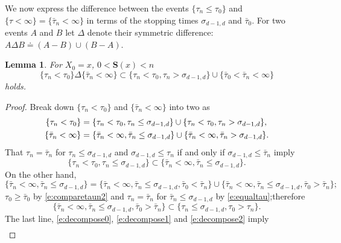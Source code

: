\documentclass[11pt,a4paper]{article}
\newtheorem{lemma}{Lemma}
\begin{document}
We now express the difference between the events
$\{\tau_n \le \tau_0\}$ and $\{\tau < \infty \} = \{\bar\tau_n < \infty \}$
in terms of the stopping times $\sigma_{d-1,d}$ and $\bar\tau_0.$
For two events $A$ and $B$ let $\Delta$ denote their symmetric difference:
$A \Delta B \doteq ( A - B) \cup (B - A).$
\begin{lemma}\label{l:boundondifference}
For $X_0 = x$,  $0 < {\bm S}(x) < n$
\begin{equation}\label{e:boundondifference}
\{\tau_n < \tau_0\}  \Delta \{ \bar\tau_n < \infty\}
\subset
\{ \tau_n < \tau_0,  \tau_n >\sigma_{d-1,d} \}
\cup \{ \bar\tau_0  < \bar\tau_n < \infty\}
\end{equation}
holds.
\end{lemma}
\begin{proof}
Break down $\{\tau_n < \tau_0\}$ and
$\{\bar\tau_n < \infty\}$ into two as
\begin{align}\label{e:decompose0}
\{ \tau_n < \tau_0 \} &= \{ \tau_n < \tau_0,  \tau_n \le \sigma_{d-1,d} \} \cup \{ \tau_n < \tau_0,  \tau_n > \sigma_{d-1,d} \},\\
\{ \bar\tau_n < \infty \} &= \{ \bar\tau_n < \infty,  \bar\tau_n \le \sigma_{d-1,d} \} \cup \{ \bar\tau_n < \infty,  \bar\tau_n > \sigma_{d-1,d} \}.
\notag
\end{align}
That $\tau_n = \bar\tau_n$ for  $\tau_n \le \sigma_{d-1,d}$ and
$\sigma_{d-1,d} \le \tau_n$ if and only if 
$\sigma_{d-1,d} \le \bar\tau_n$ imply
\begin{equation}\label{e:decompose1}
\{ \tau_n < \tau_0,  \tau_n \le \sigma_{d-1,d} \}
\subset 
\{ \bar\tau_n < \infty ,  \bar\tau_n \le \sigma_{d-1,d} \}.
\end{equation}
On the other hand,
\begin{equation}\label{e:decompose2}
\{ \bar\tau_n < \infty ,  \bar\tau_n \le \sigma_{d-1,d} \} = 
\{ \bar\tau_n < \infty ,  \bar\tau_n \le \sigma_{d-1,d}, \bar\tau_0  < \bar\tau_n \}  \cup
\{ \bar\tau_n < \infty ,  \bar\tau_n \le \sigma_{d-1,d}, \bar\tau_0 > \bar\tau_n \};
\end{equation}
$\tau_0 \ge \bar\tau_0$ 
by \eqref{e:comparetaun2}  and 
$\tau_n = \bar\tau_n$
for $\bar\tau_n \le \sigma_{d-1,d}$ by \eqref{e:equaltau};therefore
\[
\{ \bar\tau_n < \infty ,  \bar\tau_n \le \sigma_{d-1,d}, \bar\tau_0 > \bar\tau_n \} \subset
\{ \tau_n \le \sigma_{d-1,d}, \tau_0 > \tau_n \}.
\]
The last line, \eqref{e:decompose0}, \eqref{e:decompose1} and \eqref{e:decompose2} 
imply
\begin{align}\label{e:almostthere}

\end{align}
\end{proof}
\end{document}

